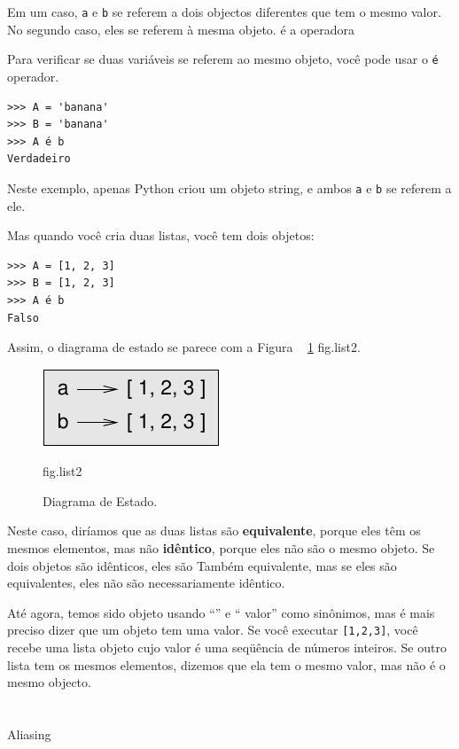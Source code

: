 \documentclass[10pt]{book}
\begin{document}
Em um caso, {\tt a} e {\tt b} se referem a dois objectos diferentes que
tem o mesmo valor. No segundo caso, eles se referem à mesma
objeto.
\index{} é a operadora

Para verificar se duas variáveis ​​se referem ao mesmo objeto, você pode
usar o {\tt é} operador.

\begin{verbatim}
>>> A = 'banana'
>>> B = 'banana'
>>> A é b
Verdadeiro
\end{verbatim}
%
Neste exemplo, apenas Python criou um objeto string,
e ambos {\tt a} e {\tt b} se referem a ele.

Mas quando você cria duas listas, você tem dois objetos:

\begin{verbatim}
>>> A = [1, 2, 3]
>>> B = [1, 2, 3]
>>> A é b
Falso
\end{verbatim}
%
Assim, o diagrama de estado se parece com a Figura ~ \ref {} fig.list2.

\begin{figure}
\centerline
{\includegraphics[scale = 0.8] {figs/list2.pdf}}
\caption{Diagrama de Estado.}
\label{} fig.list2
\end{figure}


Neste caso, diríamos que as duas listas são {\bf equivalente},
porque eles têm os mesmos elementos, mas não {\bf idêntico}, porque
eles não são o mesmo objeto. Se dois objetos são idênticos, eles são
Também equivalente, mas se eles são equivalentes, eles não são necessariamente
idêntico.

Até agora, temos sido objeto usando ``'' e `` valor''
como sinônimos, mas é mais preciso dizer que um objeto tem uma
valor. Se você executar {\tt [1,2,3]}, você recebe uma lista
objeto cujo valor é uma seqüência de números inteiros. Se outro
lista tem os mesmos elementos, dizemos que ela tem o mesmo valor, mas
não é o mesmo objecto.


\section{} Aliasing
\end{document}

